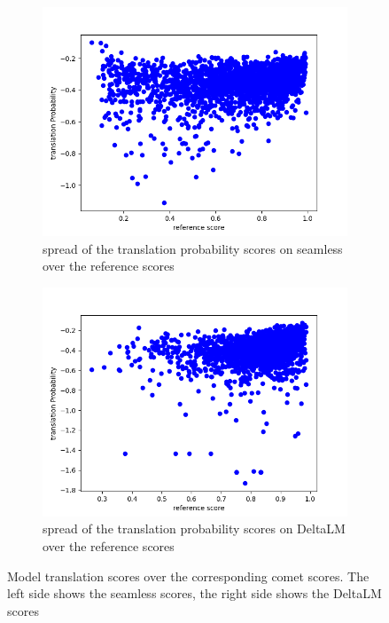 \begin{figure}[ht]
    \centering%
    \begin{subfigure}{0.4\linewidth}
        \includegraphics[width=\textwidth]{Latex/sections/images/seamlessgenprob.png}
        \caption{spread of the translation probability scores on seamless over the reference scores}
    \end{subfigure}
    \begin{subfigure}{0.4\linewidth}
        \includegraphics[width=\textwidth]{Latex/sections/images/dlmgenprob.png}
        \caption{spread of the translation probability scores on DeltaLM over the reference scores}
    \end{subfigure}
   \caption{Model translation scores over the corresponding comet scores. The left side shows the seamless scores, the right side shows the DeltaLM scores}
    \label{fig:translationeval scatter plot translation}
    \end{figure}

